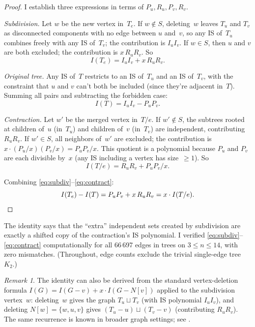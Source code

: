 \documentclass[12pt,oneside]{article}
\theoremstyle{remark}
\newtheorem{remark}[theorem]{Remark}
\begin{document}
\begin{proof}
I establish three expressions in terms of $P_u, R_u, P_v, R_v$.

\emph{Subdivision.}
Let $w$ be the new vertex in~$T_e$.
If $w \notin S$, deleting~$w$ leaves $T_u$ and $T_v$ as disconnected components with no edge between $u$ and~$v$, so any IS of~$T_u$ combines freely with any IS of~$T_v$; the contribution is $I_u I_v$.
If $w \in S$, then $u$ and $v$ are both excluded; the contribution is $x\, R_u R_v$.
So
\begin{equation}\label{eq:subdiv}
  I(T_e) = I_u I_v + x\, R_u R_v.
\end{equation}

\emph{Original tree.}
Any IS of~$T$ restricts to an IS of~$T_u$ and an IS of~$T_v$, with the constraint that $u$ and $v$ can't both be included (since they're adjacent in~$T$).
Summing all pairs and subtracting the forbidden case:
\begin{equation}\label{eq:original}
  I(T) = I_u I_v - P_u P_v.
\end{equation}

\emph{Contraction.}
Let $w'$ be the merged vertex in~$T/e$.
If $w' \notin S$, the subtrees rooted at children of~$u$ (in~$T_u$) and children of~$v$ (in~$T_v$) are independent, contributing $R_u R_v$.
If $w' \in S$, all neighbors of~$w'$ are excluded; the contribution is $x \cdot (P_u/x)(P_v/x) = P_u P_v / x$.
This quotient is a polynomial because $P_u$ and $P_v$ are each divisible by~$x$ (any IS including a vertex has size~$\ge 1$).
So
\begin{equation}\label{eq:contract}
  I(T/e) = R_u R_v + P_u P_v / x.
\end{equation}

Combining \eqref{eq:subdiv}--\eqref{eq:contract}:
\[
  I(T_e) - I(T) = P_u P_v + x\, R_u R_v = x \cdot I(T/e). \qedhere
\]
\end{proof}

The identity says that the \enquote{extra} independent sets created by subdivision are exactly a shifted copy of the contraction's IS polynomial.
I verified \eqref{eq:subdiv}--\eqref{eq:contract} computationally for all 66\,697 edges in trees on $3 \le n \le 14$, with zero mismatches.
(Throughout, edge counts exclude the trivial single-edge tree $K_2$.)

\begin{remark}
  The identity can also be derived from the standard vertex-deletion formula $I(G) = I(G - v) + x \cdot I(G - N[v])$ applied to the subdivision vertex~$w$: deleting~$w$ gives the graph $T_u \sqcup T_v$ (with IS polynomial $I_u I_v$), and deleting $N[w] = \{w, u, v\}$ gives $(T_u - u) \sqcup (T_v - v)$ (contributing $R_u R_v$).
  The same recurrence is known in broader graph settings; see \textcite[Theorem~20]{trinks2014}.
\end{remark}
\end{document}
